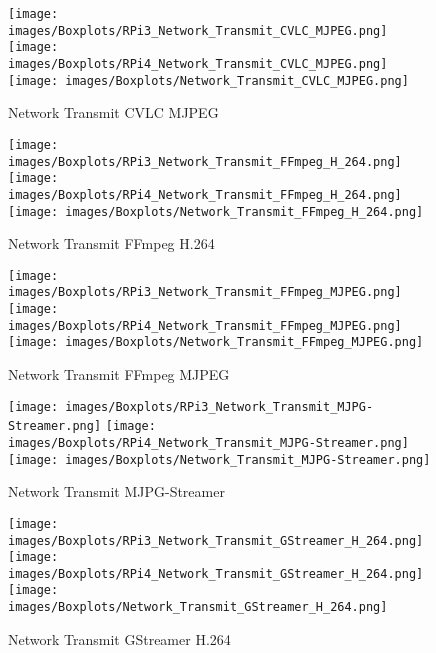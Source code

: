 \begin{figure}[H]
\centering
\texttt{[image: images/Boxplots/RPi3\_Network\_Transmit\_CVLC\_MJPEG.png]}\hfill
\texttt{[image: images/Boxplots/RPi4\_Network\_Transmit\_CVLC\_MJPEG.png]}\hfill
\texttt{[image: images/Boxplots/Network\_Transmit\_CVLC\_MJPEG.png]}
\caption{Network Transmit CVLC MJPEG}
\label{fig:bp19}
\end{figure}

\begin{figure}[H]
\centering
\texttt{[image: images/Boxplots/RPi3\_Network\_Transmit\_FFmpeg\_H\_264.png]}\hfill
\texttt{[image: images/Boxplots/RPi4\_Network\_Transmit\_FFmpeg\_H\_264.png]}\hfill
\texttt{[image: images/Boxplots/Network\_Transmit\_FFmpeg\_H\_264.png]}
\caption{Network Transmit FFmpeg H.264}
\label{fig:bp20}
\end{figure}

\begin{figure}[H]
\centering
\texttt{[image: images/Boxplots/RPi3\_Network\_Transmit\_FFmpeg\_MJPEG.png]}\hfill
\texttt{[image: images/Boxplots/RPi4\_Network\_Transmit\_FFmpeg\_MJPEG.png]}\hfill
\texttt{[image: images/Boxplots/Network\_Transmit\_FFmpeg\_MJPEG.png]}
\caption{Network Transmit FFmpeg MJPEG}
\label{fig:bp21}
\end{figure}

\begin{figure}[H]
\centering
\texttt{[image: images/Boxplots/RPi3\_Network\_Transmit\_MJPG-Streamer.png]}\hfill
\texttt{[image: images/Boxplots/RPi4\_Network\_Transmit\_MJPG-Streamer.png]}\hfill
\texttt{[image: images/Boxplots/Network\_Transmit\_MJPG-Streamer.png]}
\caption{Network Transmit MJPG-Streamer}
\label{fig:bp22}
\end{figure}

\begin{figure}[H]
\centering
\texttt{[image: images/Boxplots/RPi3\_Network\_Transmit\_GStreamer\_H\_264.png]}\hfill
\texttt{[image: images/Boxplots/RPi4\_Network\_Transmit\_GStreamer\_H\_264.png]}\hfill
\texttt{[image: images/Boxplots/Network\_Transmit\_GStreamer\_H\_264.png]}
\caption{Network Transmit GStreamer H.264}
\label{fig:bp23}
\end{figure}